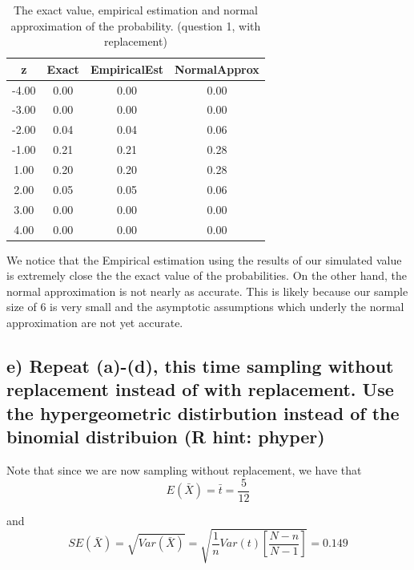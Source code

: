 \documentclass[11pt]{article}
\begin{document}
\begin{table}[H]
\centering
\begin{tabular}{|c|ccc|}
  \hline
z & Exact & EmpiricalEst & NormalApprox \\ 
  \hline
-4.00 & 0.00 & 0.00 & 0.00 \\ 
  -3.00 & 0.00 & 0.00 & 0.00 \\ 
  -2.00 & 0.04 & 0.04 & 0.06 \\ 
  -1.00 & 0.21 & 0.21 & 0.28 \\ 
  1.00 & 0.20 & 0.20 & 0.28 \\ 
  2.00 & 0.05 & 0.05 & 0.06 \\ 
  3.00 & 0.00 & 0.00 & 0.00 \\ 
  4.00 & 0.00 & 0.00 & 0.00 \\ 
   \hline
\end{tabular}
\caption{The exact value, empirical estimation and normal approximation of the probability. (question 1, with replacement)} 
\end{table}

\noindent We notice that the Empirical estimation using the results of our simulated value is extremely close the the exact value of the probabilities. On the other hand, the normal approximation is not nearly as accurate. This is likely because our sample size of 6 is very small and the asymptotic assumptions which underly the normal approximation are not yet accurate.



\subsection*{e) Repeat (a)-(d), this time sampling without replacement instead of with replacement. Use the hypergeometric distirbution instead of the binomial distribuion (R hint: phyper)}


\noindent Note that since we are now sampling without replacement, we have that
$$E(\bar{X}) = \bar{t} = \frac{5}{12}$$

\noindent and
$$SE(\bar{X}) = \sqrt{Var(\bar{X})} = \sqrt{\frac{1}{n} Var(t) \left[\frac{N - n}{N - 1}\right]} = 0.149$$
\end{document}

